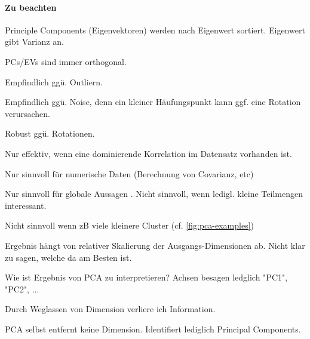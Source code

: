 \documentclass[10pt]{article} %
\begin{document}
\paragraph{Zu beachten} 
\begin{cptitemize} 
    \item Principle Components (Eigenvektoren) werden nach Eigenwert sortiert. Eigenwert gibt Varianz an.
    \item PCs/EVs sind immer orthogonal.
    \vspace{0.5em}
    \item Empfindlich ggü. Outliern.
    \item Empfindlich ggü. Noise, denn ein kleiner Häufungspunkt kann ggf. eine Rotation verursachen.
    \item Robust ggü. Rotationen.
    \vspace{0.5em}
    \item Nur effektiv, wenn eine dominierende Korrelation im Datensatz vorhanden ist.
    \item Nur sinnvoll für numerische Daten (Berechnung von Covarianz, etc)
    \item Nur sinnvoll für globale Aussagen . Nicht sinnvoll, wenn ledigl. kleine Teilmengen interessant.
    \item Nicht sinnvoll wenn zB viele kleinere Cluster (cf. \ref{fig:pca-examples})
    \vspace{0.5em}
    \item Ergebnis hängt von relativer Skalierung der Ausgangs-Dimensionen ab. Nicht klar zu sagen, welche da am Besten ist.
    \item Wie ist Ergebnis von PCA zu interpretieren? Achsen besagen
      ledglich "PC1", "PC2", ...
    \item Durch Weglassen von Dimension verliere ich Information.
    \item PCA selbst entfernt keine Dimension. Identifiert lediglich Principal Components.
\end{cptitemize} 
\end{document}
